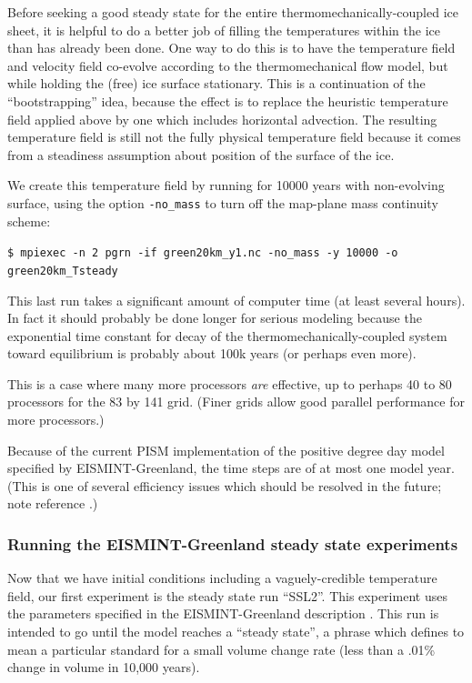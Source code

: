 \documentclass[11pt,final]{amsart}
\begin{document}
Before seeking a good steady state for the entire thermomechanically-coupled ice sheet, it is helpful to do a better job of filling the temperatures within the ice than has already been done.  One way to do this is to have the temperature field and velocity field co-evolve according to the thermomechanical flow model, but while holding the (free) ice surface stationary.  This is a continuation of the ``bootstrapping'' idea, because the effect is to replace the heuristic temperature field applied above by one which includes horizontal advection.  The resulting temperature field is still not the fully physical temperature field because it comes from a steadiness assumption about position of the surface of the ice.

We create this temperature field by running for 10000 years with non-evolving surface, using the option \verb|-no_mass| to turn off the map-plane mass continuity scheme:

\verb|$ mpiexec -n 2 pgrn -if green20km_y1.nc -no_mass -y 10000 -o green20km_Tsteady|

\noindent This last run takes a significant amount of computer time (at least several hours).  In fact it should probably be done longer for serious modeling because the exponential time constant for decay of the thermomechanically-coupled system toward equilibrium is probably about 100k years (or perhaps even more).

This is a case where many more processors \emph{are} effective, up to perhaps 40 to 80 processors for the 83 by 141 grid.  (Finer grids allow good parallel performance for more processors.)

Because of the current PISM implementation of the positive degree day model specified by EISMINT-Greenland, the time steps are of at most one model year.  (This is one of several efficiency issues which should be resolved in the future; note reference \cite{CalovGreve05}.)

\subsubsection*{Running the EISMINT-Greenland steady state experiments}  Now that we have initial conditions including a vaguely-credible temperature field, our first experiment is the steady state run ``SSL2''.  This experiment uses the parameters specified in the EISMINT-Greenland description \cite{RitzEISMINT}.  This run is intended to go until the model reaches a ``steady state'', a phrase which \cite{RitzEISMINT} defines to mean a particular standard for a small volume change rate (less than a .01\% change in volume in 10,000 years).
\end{document}
